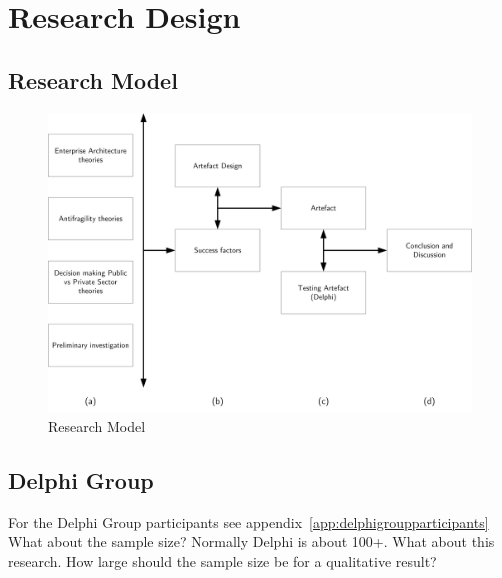 \chapter{Research Design}
\label{ch:research-methodology}

\section{Research Model}
\label{sec:research-model}
	\begin{figure}[h]
		\centering
		\includegraphics[width=12cm]{images/research-model.png}
		\caption[Research Model]{Research Model}
		\label{fig:research-model}
	\end{figure}

\section{Delphi Group}
For the Delphi Group participants see appendix~\ref{app:delphigroupparticipants} \\%

What about the sample size? Normally Delphi is about 100+. What about this research. How large should the sample size be for a qualitative result?

